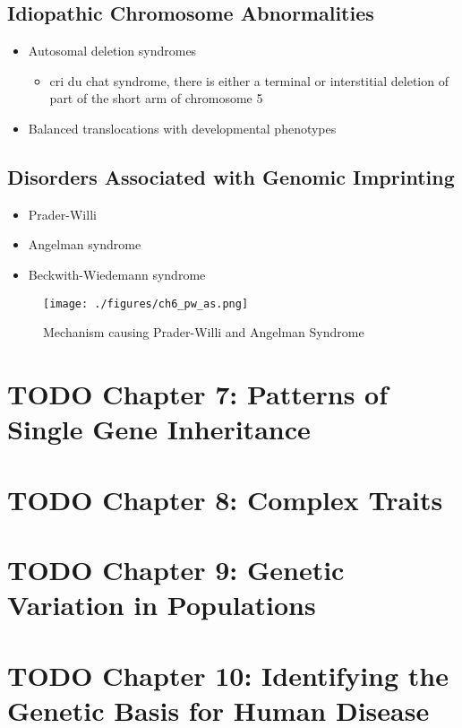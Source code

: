 \documentclass{scrartcl}
\begin{document}
\subsection{Idiopathic Chromosome Abnormalities}
\label{sec:orgec8f8d5}
\begin{itemize}
\item Autosomal deletion syndromes
\begin{itemize}
\item cri du chat syndrome, there is either a terminal or interstitial
deletion of part of the short arm of chromosome 5
\end{itemize}
\item Balanced translocations with developmental phenotypes
\end{itemize}

\subsection{Disorders Associated with Genomic Imprinting}
\label{sec:org2a4c14a}
\begin{itemize}
\item Prader-Willi
\item Angelman syndrome
\item Beckwith-Wiedemann syndrome
\end{itemize}

\begin{figure}[htbp]
\centering
\texttt{[image: ./figures/ch6\_pw\_as.png]}
\caption{\label{fig:orgcfaa5f3}
Mechanism causing Prader-Willi and Angelman Syndrome}
\end{figure}

\section{{\bfseries\sffamily TODO} Chapter 7: Patterns of Single Gene Inheritance}
\label{sec:orgc6027f8}
\section{{\bfseries\sffamily TODO} Chapter 8: Complex Traits}
\label{sec:org9e99fa4}
\section{{\bfseries\sffamily TODO} Chapter 9: Genetic Variation in Populations}
\label{sec:orgc3b1eff}
\section{{\bfseries\sffamily TODO} Chapter 10: Identifying the Genetic Basis for Human Disease}
\label{sec:org3054371}
\end{document}
